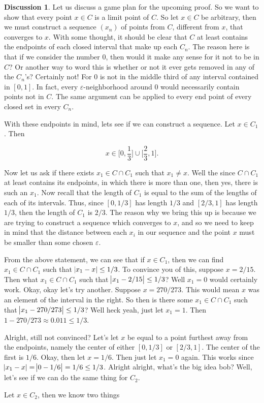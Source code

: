 \documentclass{article}
\theoremstyle{definition}
\theoremstyle{remark}
\theoremstyle{definition}
\newtheorem*{discussion}{Discussion}
\begin{document}
\begin{discussion}
    Let us discuss a game plan for the upcoming proof. So we want to show that every point $x\in C$ is a limit point of $C$. So let $x\in C$ be arbitrary, then we must construct a sequence $(x_n)$ of points from $C$, different from $x$, that converges to $x$. With some thought, it should be clear that $C$ at least contains the endpoints of each closed interval that make up each $C_n$. The reason here is that if we consider the number 0, then would it make any sense for it not to be in $C$? Or another way to word this is whether or not it ever gets removed in any of the $C_n$'s? Certainly not! For 0 is not in the middle third of any interval contained in $[0,1]$. In fact, every $\varepsilon$-neighborhood around 0 would necessarily contain points not in $C$. The same argument can be applied to every end point of every closed set in every $C_n$.\par
    With these endpoints in mind, lets see if we can construct a sequence. Let $x\in C_1$. Then 
    
    \begin{equation*}
        x\in\bigg[0,\frac{1}{3}\bigg]\cup\bigg[\frac{2}{3},1\bigg].
    \end{equation*}
    
    Now let us ask if there exists $x_1\in C\cap C_1$ such that $x_1\neq x$. Well the since $C\cap C_1$ at least contains its endpoints, in which there is more than one, then yes, there is such an $x_1$. Now recall that the length of $C_1$ is equal to the sum of the lengths of each of its intervals. Thus, since $[0,1/3]$ has length $1/3$ and $[2/3,1]$ has length $1/3$, then the length of $C_1$ is $2/3$. The reason why we bring this up is because we are trying to construct a sequence which converges to $x$, and so we need to keep in mind that the distance between each $x_i$ in our sequence and the point $x$ must be smaller than some chosen $\varepsilon$.\par 
    From the above statement, we can see that if $x\in C_1$, then we can find $x_1\in C\cap C_1$ such that $\abs{x_1-x}\leq 1/3$. To convince you of this, suppose $x=2/15$. Then what $x_1\in C\cap C_1$ such that $\abs{x_1-2/15}\leq 1/3$? Well $x_1=0$ would certainly work. Okay, okay let's try another. Suppose $x=270/273$. This would mean $x$ was an element of the interval in the right. So then is there some $x_1\in C\cap C_1$ such that $\abs{x_1-270/273}\leq 1/3$? Well heck yeah, just let $x_1=1$. Then $1-270/273\approx0.011\leq 1/3$.\par  Alright, still not convinced? Let's let $x$ be equal to a point furthest away from the endpoints, namely the center of either $[0,1/3]$ or $[2/3,1]$. The center of the first is $1/6$. Okay, then let $x=1/6$. Then just let $x_1=0$ again. This works since $\abs{x_1-x}=\abs{0-1/6}=1/6\leq1/3$. Alright alright, what's the big idea bob? Well, let's see if we can do the same thing for $C_2$.\par 
    Let $x\in C_2$, then we know two things
    

\end{discussion}
\end{document}
